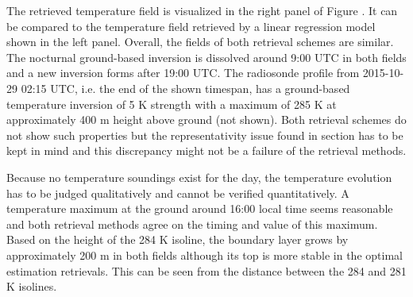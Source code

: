     The retrieved temperature field is visualized in the right panel of Figure
    . It can be compared to the temperature field
    retrieved by a linear regression model shown in the left panel. Overall,
    the fields of both retrieval schemes are similar. The nocturnal
    ground-based inversion is dissolved around 9:00 UTC in both fields and
    a new inversion forms after 19:00 UTC. The radiosonde profile from
    2015-10-29 02:15 UTC, i.e. the end of the shown timespan, has
    a ground-based temperature inversion of 5 K strength with a maximum of 285
    K at approximately 400 m height above ground (not shown). Both retrieval
    schemes do not show such properties but the representativity issue
    found in section \in[ch:hatproeval] has to be kept in mind and this
    discrepancy might not be a failure of the retrieval methods.

        {}

    Because no temperature soundings exist for the day, the temperature
    evolution has to be judged qualitatively and cannot be verified
    quantitatively. A temperature maximum at the ground around 16:00 local
    time seems reasonable and both retrieval methods agree on the timing and
    value of this maximum. Based on the height of the 284 K isoline, the
    boundary layer grows by approximately 200 m in both fields although its top
    is more stable in the optimal estimation retrievals. This can be seen from
    the distance between the 284 and 281 K isolines.

\stopsubsection

\stopsection

